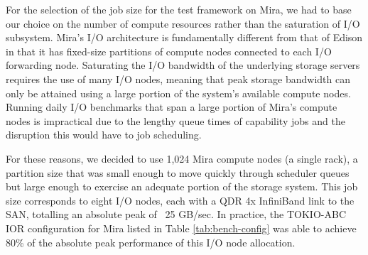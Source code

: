 
For the selection of the job size for the test framework on Mira, we had to
base our choice on the number of compute resources rather than the saturation of
I/O subsystem.
Mira's I/O architecture is fundamentally different from that of Edison in that it has fixed-size partitions of compute nodes connected to each I/O forwarding node.
Saturating the I/O bandwidth of the underlying storage servers requires the
use of many I/O nodes, meaning that peak storage bandwidth can only be
attained using a large portion of the system's available compute nodes.
Running daily I/O benchmarks that span a large portion of Mira's compute
nodes is impractical due to the lengthy queue times of capability jobs and
the disruption this would have to job scheduling.

For these reasons, we decided to use 1,024 Mira compute nodes (a single
rack), a partition size that was small enough to move quickly through
scheduler queues but large enough to exercise an adequate portion of the
storage system.  This job size corresponds to eight I/O nodes, each with a QDR 4x InfiniBand link to the SAN, totalling an absolute peak of ~25 GB/sec.
In practice, the TOKIO-ABC IOR configuration for Mira listed in Table \ref{tab:bench-config} was able to achieve 80\% of the absolute peak performance of this I/O node allocation.

